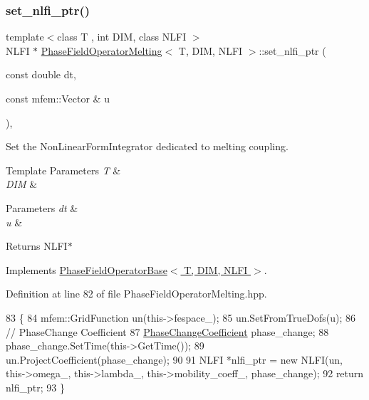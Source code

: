 \subsubsection{\texorpdfstring{set\+\_\+nlfi\+\_\+ptr()}{set\_nlfi\_ptr()}}
{\footnotesize\ttfamily template$<$class T , int D\+IM, class N\+L\+FI $>$ \\
N\+L\+FI $\ast$ \hyperlink{classPhaseFieldOperatorMelting}{Phase\+Field\+Operator\+Melting}$<$ T, D\+IM, N\+L\+FI $>$\+::set\+\_\+nlfi\+\_\+ptr (\begin{DoxyParamCaption}\item[{const double}]{dt,  }\item[{const mfem\+::\+Vector \&}]{u }\end{DoxyParamCaption})\hspace{0.3cm}{\ttfamily [override]}, {\ttfamily [virtual]}}



Set the Non\+Linear\+Form\+Integrator dedicated to melting coupling. 


\begin{DoxyTemplParams}{Template Parameters}
{\em T} & \\
\hline
{\em D\+IM} & \\
\hline
\end{DoxyTemplParams}

\begin{DoxyParams}{Parameters}
{\em dt} & \\
\hline
{\em u} & \\
\hline
\end{DoxyParams}
\begin{DoxyReturn}{Returns}
N\+L\+F\+I$\ast$ 
\end{DoxyReturn}


Implements \hyperlink{classPhaseFieldOperatorBase}{Phase\+Field\+Operator\+Base$<$ T, D\+I\+M, N\+L\+F\+I $>$}.



Definition at line 82 of file Phase\+Field\+Operator\+Melting.\+hpp.


\begin{DoxyCode}
83                                                                                  \{
84   mfem::GridFunction un(this->fespace\_);
85   un.SetFromTrueDofs(u);
86   \textcolor{comment}{// PhaseChange Coefficient}
87   \hyperlink{classPhaseChangeCoefficient}{PhaseChangeCoefficient} phase\_change;
88   phase\_change.SetTime(this->GetTime());
89   un.ProjectCoefficient(phase\_change);
90 
91   NLFI *nlfi\_ptr = \textcolor{keyword}{new} NLFI(un, this->omega\_, this->lambda\_, this->mobility\_coeff\_, phase\_change);
92   \textcolor{keywordflow}{return} nlfi\_ptr;
93 \}
\end{DoxyCode}
\mbox{\label{classPhaseFieldOperatorBase_ae28add1cf3731d10726a9665862a725b}} 
